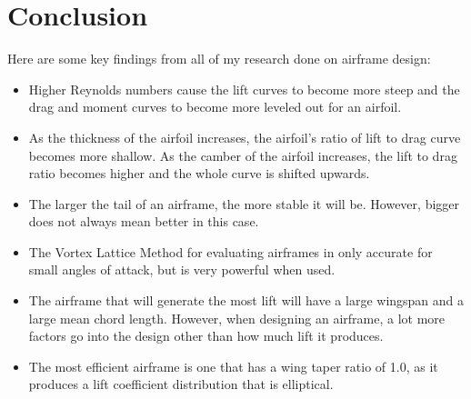 \documentclass{journal}
\begin{document}
	\section{Conclusion}
	Here are some key findings from all of my research done on airframe design:
	 \begin{itemize}
	 	\item Higher Reynolds numbers cause the lift curves to become more steep and the drag and moment curves to become more leveled out for an airfoil.
	 	\item As the thickness of the airfoil increases, the airfoil's ratio of lift to drag curve becomes more shallow. As the camber of the airfoil increases, the lift to drag ratio becomes higher and the whole curve is shifted upwards. 
	 	\item The larger the tail of an airframe, the more stable it will be. However, bigger does not always mean better in this case.
	 	\item The Vortex Lattice Method for evaluating airframes in only accurate for small angles of attack, but is very powerful when used.
	 	\item The airframe that will generate the most lift will have a large wingspan and a large mean chord length. However, when designing an airframe, a lot more factors go into the design other than how much lift it produces.
	 	\item The most efficient airframe is one that has a wing taper ratio of 1.0, as it produces a lift coefficient distribution that is elliptical.
	 \end{itemize}
 	
 	\printbibliography
	
\end{document}
